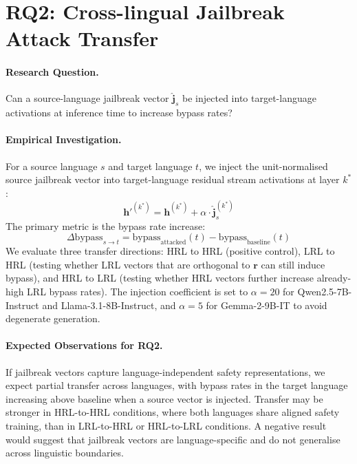 \section{RQ2: Cross-lingual Jailbreak Attack Transfer}
\label{sec:rq2}

\paragraph{Research Question.}
Can a source-language jailbreak vector $\hat{\mathbf{j}}_s$ be injected into target-language activations at inference time to increase bypass rates?

\paragraph{Empirical Investigation.}
For a source language $s$ and target language $t$, we inject the unit-normalised source jailbreak vector into target-language residual stream activations at layer $k^*$:
%
\begin{equation}
    \mathbf{h}'^{(k^*)} = \mathbf{h}^{(k^*)} + \alpha \cdot \hat{\mathbf{j}}_s^{(k^*)}
    \label{eq:attack}
\end{equation}
%
The primary metric is the bypass rate increase:
%
\begin{equation}
    \Delta\mathrm{bypass}_{s \to t} = \mathrm{bypass}_\mathrm{attacked}(t) - \mathrm{bypass}_\mathrm{baseline}(t)
    \label{eq:delta_bypass}
\end{equation}
%
We evaluate three transfer directions: HRL to HRL (positive control), LRL to HRL (testing whether LRL vectors that are orthogonal to $\mathbf{r}$ can still induce bypass), and HRL to LRL (testing whether HRL vectors further increase already-high LRL bypass rates). The injection coefficient is set to $\alpha = 20$ for Qwen2.5-7B-Instruct and Llama-3.1-8B-Instruct, and $\alpha = 5$ for Gemma-2-9B-IT to avoid degenerate generation.

\paragraph{Expected Observations for RQ2.}
If jailbreak vectors capture language-independent safety representations, we expect partial transfer across languages, with bypass rates in the target language increasing above baseline when a source vector is injected. Transfer may be stronger in HRL-to-HRL conditions, where both languages share aligned safety training, than in LRL-to-HRL or HRL-to-LRL conditions. A negative result would suggest that jailbreak vectors are language-specific and do not generalise across linguistic boundaries.

